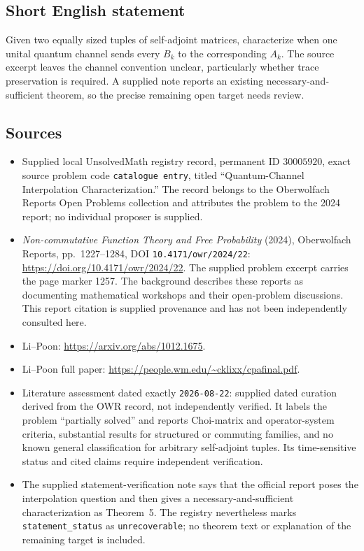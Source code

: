 \documentclass[11pt]{article}
\begin{document}
\subsection{Short English statement}
Given two equally sized tuples of self-adjoint matrices, characterize when one unital quantum channel sends every \(B_k\) to the corresponding \(A_k\). The source excerpt leaves the channel convention unclear, particularly whether trace preservation is required. A supplied note reports an existing necessary-and-sufficient theorem, so the precise remaining open target needs review.
\subsection{Sources}
\begin{itemize}
\item Supplied local UnsolvedMath registry record, permanent ID \(30005920\), exact source problem code \texttt{catalogue entry}, titled ``Quantum-Channel Interpolation Characterization.'' The record belongs to the Oberwolfach Reports Open Problems collection and attributes the problem to the 2024 report; no individual proposer is supplied.
\item \emph{Non-commutative Function Theory and Free Probability} (2024), Oberwolfach Reports, pp.~1227--1284, DOI \texttt{10.4171/owr/2024/22}: \url{https://doi.org/10.4171/owr/2024/22}. The supplied problem excerpt carries the page marker 1257. The background describes these reports as documenting mathematical workshops and their open-problem discussions. This report citation is supplied provenance and has not been independently consulted here.
\item Li--Poon: \url{https://arxiv.org/abs/1012.1675}.
\item Li--Poon full paper: \url{https://people.wm.edu/~cklixx/cpafinal.pdf}.
\item Literature assessment dated exactly \texttt{2026-08-22}: supplied dated curation derived from the OWR record, not independently verified. It labels the problem ``partially solved'' and reports Choi-matrix and operator-system criteria, substantial results for structured or commuting families, and no known general classification for arbitrary self-adjoint tuples. Its time-sensitive status and cited claims require independent verification.
\item The supplied statement-verification note says that the official report poses the interpolation question and then gives a necessary-and-sufficient characterization as Theorem~5. The registry nevertheless marks \texttt{statement\_status} as \texttt{unrecoverable}; no theorem text or explanation of the remaining target is included.
\end{itemize}
\end{document}
